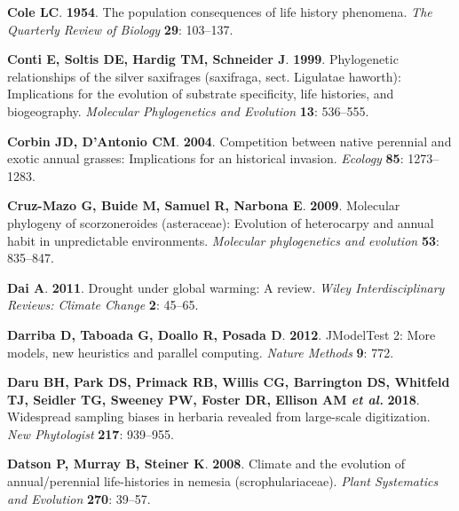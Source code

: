 \documentclass[man,floatsintext]{apa6}
\theoremstyle{definition}
\theoremstyle{definition}
\theoremstyle{definition}
\theoremstyle{remark}
\begin{document}
\leavevmode\hypertarget{ref-cole1954population}{}%
\textbf{\textnormal{Cole LC}}. \textbf{1954}. The population
consequences of life history phenomena. \emph{The Quarterly Review of
Biology} \textbf{29}: 103--137.

\leavevmode\hypertarget{ref-conti1999phylogenetic}{}%
\textbf{\textnormal{Conti E}, \textnormal{Soltis DE}, \textnormal{Hardig
TM}, \textnormal{Schneider J}}. \textbf{1999}. Phylogenetic
relationships of the silver saxifrages (saxifraga, sect. Ligulatae
haworth): Implications for the evolution of substrate specificity, life
histories, and biogeography. \emph{Molecular Phylogenetics and
Evolution} \textbf{13}: 536--555.

\leavevmode\hypertarget{ref-corbin2004competition}{}%
\textbf{\textnormal{Corbin JD}, \textnormal{D'Antonio CM}}.
\textbf{2004}. Competition between native perennial and exotic annual
grasses: Implications for an historical invasion. \emph{Ecology}
\textbf{85}: 1273--1283.

\leavevmode\hypertarget{ref-cruz2009molecular}{}%
\textbf{\textnormal{Cruz-Mazo G}, \textnormal{Buide M},
\textnormal{Samuel R}, \textnormal{Narbona E}}. \textbf{2009}. Molecular
phylogeny of scorzoneroides (asteraceae): Evolution of heterocarpy and
annual habit in unpredictable environments. \emph{Molecular
phylogenetics and evolution} \textbf{53}: 835--847.

\leavevmode\hypertarget{ref-dai2011drought}{}%
\textbf{\textnormal{Dai A}}. \textbf{2011}. Drought under global
warming: A review. \emph{Wiley Interdisciplinary Reviews: Climate
Change} \textbf{2}: 45--65.

\leavevmode\hypertarget{ref-darriba2012jmodeltest}{}%
\textbf{\textnormal{Darriba D}, \textnormal{Taboada G},
\textnormal{Doallo R}, \textnormal{Posada D}}. \textbf{2012}. JModelTest
2: More models, new heuristics and parallel computing. \emph{Nature
Methods} \textbf{9}: 772.

\leavevmode\hypertarget{ref-daru2018widespread}{}%
\textbf{\textnormal{Daru BH}, \textnormal{Park DS}, \textnormal{Primack
RB}, \textnormal{Willis CG}, \textnormal{Barrington DS},
\textnormal{Whitfeld TJ}, \textnormal{Seidler TG}, \textnormal{Sweeney
PW}, \textnormal{Foster DR}, \textnormal{Ellison AM} \emph{et al.}}
\textbf{2018}. Widespread sampling biases in herbaria revealed from
large-scale digitization. \emph{New Phytologist} \textbf{217}: 939--955.

\leavevmode\hypertarget{ref-datson2008climate}{}%
\textbf{\textnormal{Datson P}, \textnormal{Murray B},
\textnormal{Steiner K}}. \textbf{2008}. Climate and the evolution of
annual/perennial life-histories in nemesia (scrophulariaceae).
\emph{Plant Systematics and Evolution} \textbf{270}: 39--57.
\end{document}
